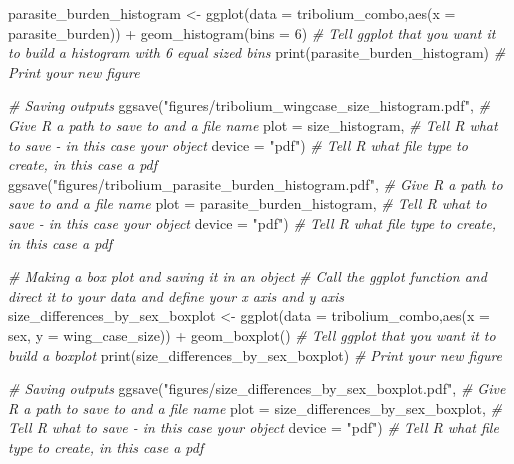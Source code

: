 \documentclass[
]{book}
\newenvironment{Shaded}{\begin{snugshade}}{\end{snugshade}}
\newcommand{\AttributeTok}[1]{\textcolor[rgb]{0.77,0.63,0.00}{#1}}
\newcommand{\CommentTok}[1]{\textcolor[rgb]{0.56,0.35,0.01}{\textit{#1}}}
\newcommand{\DecValTok}[1]{\textcolor[rgb]{0.00,0.00,0.81}{#1}}
\newcommand{\FunctionTok}[1]{\textcolor[rgb]{0.00,0.00,0.00}{#1}}
\newcommand{\NormalTok}[1]{#1}
\newcommand{\OtherTok}[1]{\textcolor[rgb]{0.56,0.35,0.01}{#1}}
\newcommand{\SpecialCharTok}[1]{\textcolor[rgb]{0.00,0.00,0.00}{#1}}
\newcommand{\StringTok}[1]{\textcolor[rgb]{0.31,0.60,0.02}{#1}}
\begin{document}
\begin{Shaded}
\begin{Highlighting}[]
\NormalTok{parasite\_burden\_histogram }\OtherTok{\textless{}{-}} \FunctionTok{ggplot}\NormalTok{(}\AttributeTok{data =}\NormalTok{ tribolium\_combo,}\FunctionTok{aes}\NormalTok{(}\AttributeTok{x =}\NormalTok{ parasite\_burden)) }\SpecialCharTok{+} 
  \FunctionTok{geom\_histogram}\NormalTok{(}\AttributeTok{bins =} \DecValTok{6}\NormalTok{) }\CommentTok{\# Tell ggplot that you want it to build a histogram with 6 equal sized bins}
\FunctionTok{print}\NormalTok{(parasite\_burden\_histogram) }\CommentTok{\# Print your new figure}

\CommentTok{\# Saving outputs}
\FunctionTok{ggsave}\NormalTok{(}\StringTok{"figures/tribolium\_wingcase\_size\_histogram.pdf"}\NormalTok{, }\CommentTok{\# Give R a path to save to and a file name}
       \AttributeTok{plot =}\NormalTok{ size\_histogram, }\CommentTok{\# Tell R what to save {-} in this case your object}
       \AttributeTok{device =} \StringTok{"pdf"}\NormalTok{) }\CommentTok{\# Tell R what file type to create, in this case a pdf}
\FunctionTok{ggsave}\NormalTok{(}\StringTok{"figures/tribolium\_parasite\_burden\_histogram.pdf"}\NormalTok{, }\CommentTok{\# Give R a path to save to and a file name}
       \AttributeTok{plot =}\NormalTok{ parasite\_burden\_histogram, }\CommentTok{\# Tell R what to save {-} in this case your object}
       \AttributeTok{device =} \StringTok{"pdf"}\NormalTok{) }\CommentTok{\# Tell R what file type to create, in this case a pdf}

\CommentTok{\# Making a box plot and saving it in an object}
\CommentTok{\# Call the ggplot function and direct it to your data and define your x axis and y axis}
\NormalTok{size\_differences\_by\_sex\_boxplot }\OtherTok{\textless{}{-}} \FunctionTok{ggplot}\NormalTok{(}\AttributeTok{data =}\NormalTok{ tribolium\_combo,}\FunctionTok{aes}\NormalTok{(}\AttributeTok{x =}\NormalTok{ sex, }\AttributeTok{y =}\NormalTok{ wing\_case\_size)) }\SpecialCharTok{+} 
  \FunctionTok{geom\_boxplot}\NormalTok{() }\CommentTok{\# Tell ggplot that you want it to build a boxplot}
\FunctionTok{print}\NormalTok{(size\_differences\_by\_sex\_boxplot) }\CommentTok{\# Print your new figure}

\CommentTok{\# Saving outputs}
\FunctionTok{ggsave}\NormalTok{(}\StringTok{"figures/size\_differences\_by\_sex\_boxplot.pdf"}\NormalTok{, }\CommentTok{\# Give R a path to save to and a file name}
       \AttributeTok{plot =}\NormalTok{ size\_differences\_by\_sex\_boxplot, }\CommentTok{\# Tell R what to save {-} in this case your object}
       \AttributeTok{device =} \StringTok{"pdf"}\NormalTok{) }\CommentTok{\# Tell R what file type to create, in this case a pdf}


\end{Highlighting}
\end{Shaded}
\end{document}
